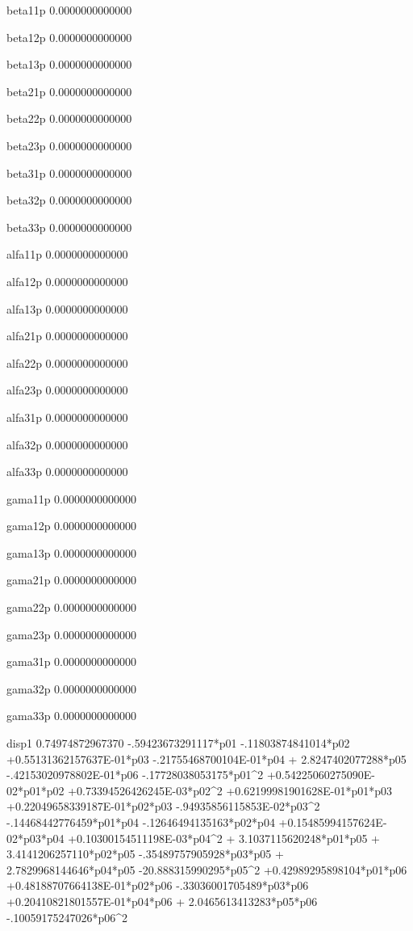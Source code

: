  beta11p
   0.0000000000000 
  
 beta12p
   0.0000000000000 
  
 beta13p
   0.0000000000000 
  
 beta21p
   0.0000000000000 
  
 beta22p
   0.0000000000000 
  
 beta23p
   0.0000000000000 
  
 beta31p
   0.0000000000000 
  
 beta32p
   0.0000000000000 
  
 beta33p
   0.0000000000000 
  
 alfa11p
   0.0000000000000 
  
 alfa12p
   0.0000000000000 
  
 alfa13p
   0.0000000000000 
  
 alfa21p
   0.0000000000000 
  
 alfa22p
   0.0000000000000 
  
 alfa23p
   0.0000000000000 
  
 alfa31p
   0.0000000000000 
  
 alfa32p
   0.0000000000000 
  
 alfa33p
   0.0000000000000 
  
 gama11p
   0.0000000000000 
  
 gama12p
   0.0000000000000 
  
 gama13p
   0.0000000000000 
  
 gama21p
   0.0000000000000 
  
 gama22p
   0.0000000000000 
  
 gama23p
   0.0000000000000 
  
 gama31p
   0.0000000000000 
  
 gama32p
   0.0000000000000 
  
 gama33p
   0.0000000000000 
  
 disp1  
  0.74974872967370  -.59423673291117*p01  -.11803874841014*p02 +0.55131362157637E-01*p03  -.21755468700104E-01*p04 + 2.8247402077288*p05  -.42153020978802E-01*p06  -.17728038053175*p01^2 +0.54225060275090E-02*p01*p02 +0.73394526426245E-03*p02^2 +0.62199981901628E-01*p01*p03 +0.22049658339187E-01*p02*p03  -.94935856115853E-02*p03^2  -.14468442776459*p01*p04  -.12646494135163*p02*p04 +0.15485994157624E-02*p03*p04 +0.10300154511198E-03*p04^2 + 3.1037115620248*p01*p05 + 3.4141206257110*p02*p05  -.35489757905928*p03*p05 + 2.7829968144646*p04*p05  -20.888315990295*p05^2 +0.42989295898104*p01*p06 +0.48188707664138E-01*p02*p06  -.33036001705489*p03*p06 +0.20410821801557E-01*p04*p06 + 2.0465613413283*p05*p06  -.10059175247026*p06^2 
  
